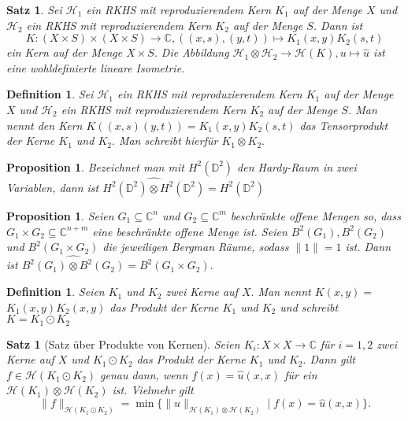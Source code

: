 \documentclass[12pt,titlepage,twoside,cleardoublepage]{article}
\theoremstyle{nummermitklammern}
\newtheorem{definition}[temp]{Definition}
\newtheorem{satz}[temp]{Satz}
\newtheorem{definition}[zahl]{Definition}
\newtheorem{satz}[zahl]{Satz}
\numberwithin{equation}{section}
\newtheorem{proposition}[zahl]{Proposition}
\begin{document}
\begin{satz}
Sei $\mathcal{H}_1$ ein RKHS mit reproduzierendem Kern $K_1$ auf der Menge $X$ und $\mathcal{H}_2$ ein RKHS mit reproduzierendem Kern $K_2$ auf der Menge $S$. Dann ist 
\[
K:(X\times S)\times (X \times S)\to \mathbb{C},((x,s),(y,t))\mapsto K_1(x,y)K_2(s,t) 
\] 
ein Kern auf der Menge $X\times S.$ Die Abbildung $\mathcal{H}_1 \otimes \mathcal{H}_2 \to  \mathcal{H}(K), u\mapsto \hat{u}$ ist eine wohldefinierte lineare Isometrie.
\end{satz}

\begin{definition}
Sei $\mathcal{H}_1$ ein RKHS mit reproduzierendem Kern $K_1$ auf der Menge $X$ und $\mathcal{H}_2$ ein RKHS mit reproduzierendem Kern $K_2$ auf der Menge $S$.
Man nennt den Kern $K((x,s)(y,t))=K_1(x,y)K_2(s,t)$ das \emph{Tensorprodukt} der Kerne $K_1$ und $K_2.$ Man schreibt hierfür  $K_1 \otimes K_2.$
\end{definition}

\begin{proposition}
Bezeichnet man mit $H^2(\mathbb{D}^2)$ den Hardy-Raum in zwei Variablen, dann ist $\widehat{H^2(\mathbb{D}^2) \otimes H^2(\mathbb{D}^2)}=H^2(\mathbb{D}^2)$ 
\end{proposition}

\begin{proposition}
Seien $G_1 \subseteq \mathbb{C}^n$ und $G_2 \subseteq \mathbb{C}^m$ beschränkte offene Mengen so, dass $G_1\times G_2\subseteq \mathbb{C}^{n+m}$ eine beschränkte offene Menge ist. Seien $B^2(G_1),B^2(G_2)$ und $B^2(G_1\times G_2)$ die jeweiligen Bergman Räume, sodass $\|1\|=1$ ist. Dann ist $\widehat{B^2(G_1)\otimes B^2(G_2)}=B^2(G_1\times G_2).$ 
\end{proposition}

\begin{definition}
Seien $K_1$ und $K_2$ zwei Kerne auf $X.$ Man nennt $K(x,y)=$ $K_1(x,y)K_2(x,y)$ das \emph{Produkt der Kerne} $K_1$ und $K_2$ und schreibt $K=K_1 \odot K_2$ 
\end{definition}

\begin{satz}[Satz über Produkte von Kernen]
Seien $K_i:X\times X\to \mathbb{C}$ für $i=1,2$ zwei Kerne auf $X$ und $K_1\odot K_2$ das Produkt der Kerne $K_1$ und $K_2.$ Dann gilt $f\in \mathcal{H}(K_1 \odot K_2)$ genau dann, wenn $f(x)=\hat{u}(x,x)$ für ein $\mathcal{H}(K_1)\otimes \mathcal{H}(K_2)$ ist. Vielmehr gilt 
\[
\|f\|_{\mathcal{H}(K_1\odot K_2)}=\min\{\|u\|_{\mathcal{H}(K_1)\otimes \mathcal{H}(K_2)}\mid f(x)=\hat{u}(x,x)\}.
\]   
\end{satz}
\end{document}
